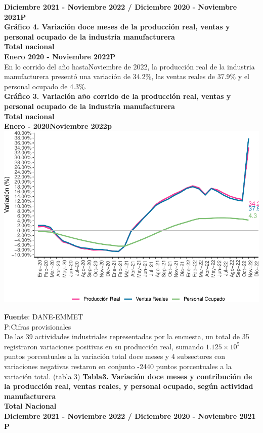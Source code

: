 \documentclass[
]{article}
\begin{document}
\textbf{Diciembre 2021 - Noviembre 2022 / Diciembre 2020 - Noviembre 2021P}\\
\textbf{Gráfico 4. Variación doce meses de la producción real, ventas y
personal ocupado de la industria manufacturera}\\
\textbf{Total nacional}\\
\textbf{Enero 2020 - Noviembre 2022P}\\

En lo corrido del año hastaNoviembre de 2022, la producción real de la
industria manufacturera presentó una variación de 34.2\%, las ventas
reales de 37.9\% y el personal ocupado de 4.3\%.\\

\textbf{Gráfico 3. Variación año corrido de la producción real, ventas y
personal ocupado de la industria manufacturera}\\
\textbf{Total nacional}\\
\textbf{Enero - 2020Noviembre 2022p}\\

\includegraphics{boletin_files/figure-latex/anio_corrido_view_2-1.pdf}

\textbf{Fuente}: DANE-EMMET\\
P:Cifras provisionales\\

De las 39 actividades industriales representadas por la encuesta, un
total de 35 registraron variaciones positivas en su producción real,
sumando \ensuremath{1.125\times 10^{5}} puntos porcentuales a la
variación total doce meses y 4 subsectores con variaciones negativas
restaron en conjunto -2440 puntos porcentuales a la variación total.
(tabla 3)
\textbf{Tabla3. Variación doce meses y contribución de la producción real, ventas reales, y personal ocupado, según actividad manufacturera}\\
\textbf{Total Nacional}\\
\textbf{Diciembre 2021 - Noviembre 2022 / Diciembre 2020 - Noviembre 2021 P}
\end{document}
